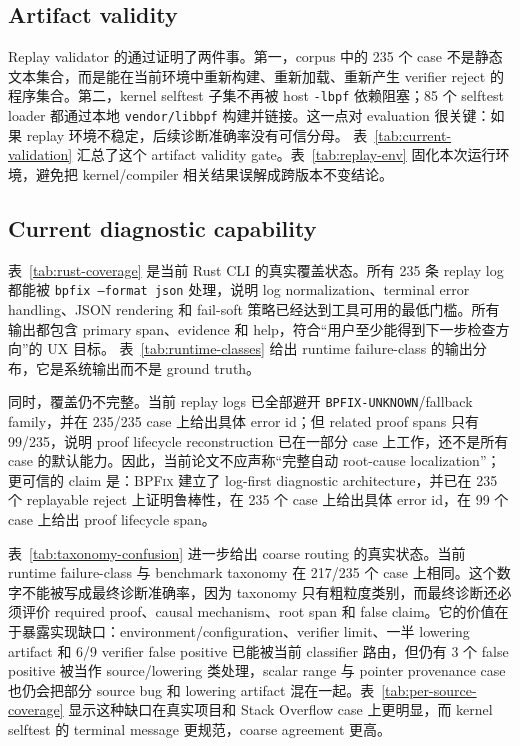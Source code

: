 \documentclass[letterpaper,twocolumn,10pt]{article}
\newcommand{\sys}{\textsc{BPFix}\xspace}
\newcommand{\code}[1]{\texttt{#1}}
\begin{document}
\subsection{Artifact validity}

Replay validator 的通过证明了两件事。第一，corpus 中的 235 个 case 不是静态文本集合，而是能在当前环境中重新构建、重新加载、重新产生 verifier reject 的程序集合。第二，kernel selftest 子集不再被 host \code{-lbpf} 依赖阻塞；85 个 selftest loader 都通过本地 \code{vendor/libbpf} 构建并链接。这一点对 evaluation 很关键：如果 replay 环境不稳定，后续诊断准确率没有可信分母。
表~\ref{tab:current-validation} 汇总了这个 artifact validity gate。表~\ref{tab:replay-env} 固化本次运行环境，避免把 kernel/compiler 相关结果误解成跨版本不变结论。

\subsection{Current diagnostic capability}

表~\ref{tab:rust-coverage} 是当前 Rust CLI 的真实覆盖状态。所有 235 条 replay log 都能被 \code{bpfix --format json} 处理，说明 log normalization、terminal error handling、JSON rendering 和 fail-soft 策略已经达到工具可用的最低门槛。所有输出都包含 primary span、evidence 和 help，符合“用户至少能得到下一步检查方向”的 UX 目标。
表~\ref{tab:runtime-classes} 给出 runtime failure-class 的输出分布，它是系统输出而不是 ground truth。

同时，覆盖仍不完整。当前 replay logs 已全部避开 \code{BPFIX-UNKNOWN}/fallback family，并在 235/235 case 上给出具体 error id；但 related proof spans 只有 99/235，说明 proof lifecycle reconstruction 已在一部分 case 上工作，还不是所有 case 的默认能力。因此，当前论文不应声称“完整自动 root-cause localization”；更可信的 claim 是：\sys 建立了 log-first diagnostic architecture，并已在 235 个 replayable reject 上证明鲁棒性，在 235 个 case 上给出具体 error id，在 99 个 case 上给出 proof lifecycle span。

表~\ref{tab:taxonomy-confusion} 进一步给出 coarse routing 的真实状态。当前 runtime failure-class 与 benchmark taxonomy 在 217/235 个 case 上相同。这个数字不能被写成最终诊断准确率，因为 taxonomy 只有粗粒度类别，而最终诊断还必须评价 required proof、causal mechanism、root span 和 false claim。它的价值在于暴露实现缺口：environment/configuration、verifier limit、一半 lowering artifact 和 6/9 verifier false positive 已能被当前 classifier 路由，但仍有 3 个 false positive 被当作 source/lowering 类处理，scalar range 与 pointer provenance case 也仍会把部分 source bug 和 lowering artifact 混在一起。表~\ref{tab:per-source-coverage} 显示这种缺口在真实项目和 Stack Overflow case 上更明显，而 kernel selftest 的 terminal message 更规范，coarse agreement 更高。
\end{document}
